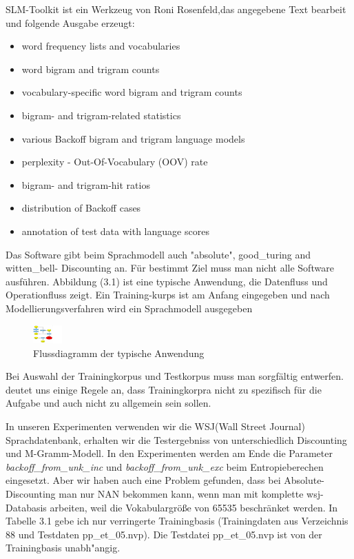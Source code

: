 SLM-Toolkit ist ein Werkzeug von Roni Rosenfeld,das angegebene Text bearbeit und folgende Ausgabe erzeugt:
\begin{itemize}
	\item word frequency lists and vocabularies
	\item word bigram and trigram counts
	\item vocabulary-specific word bigram and trigram counts
	\item bigram- and trigram-related statistics
	\item various Backoff bigram and trigram language models
	\item perplexity - Out-Of-Vocabulary (OOV) rate 
	\item bigram- and trigram-hit ratios
	\item distribution of Backoff cases 
	\item annotation of test data with language scores 
\end{itemize}

Das Software gibt beim Sprachmodell auch "absolute", good\_turing and witten\_bell- Discounting an.
F\"ur bestimmt Ziel muss man nicht alle Software ausf\"uhren. Abbildung (3.1) ist eine typische Anwendung, die Datenfluss und Operationfluss zeigt.
Ein Training-kurps ist am Anfang eingegeben und nach Modellierungsverfahren wird ein Sprachmodell ausgegeben


\begin{figure}[htbp]
	\includegraphics[width=0.1\textwidth]{bilder/toolkit.png}
	 \caption{Flussdiagramm der typische Anwendung}
  \label{fig:figure_2}
\end{figure}

Bei Auswahl der Trainingkorpus und Testkorpus muss man sorgf\"altig entwerfen. \cite{book_speech} deutet uns einige Regele an, dass Trainingkorpra nicht zu spezifisch f\"ur die Aufgabe und auch nicht zu allgemein sein sollen.  

In unseren Experimenten verwenden wir die WSJ(Wall Street Journal) Sprachdatenbank, erhalten wir die Testergebniss von unterschiedlich Discounting und M-Gramm-Modell. In den Experimenten werden am Ende die Parameter \emph{backoff\_from\_unk\_inc} und \emph{backoff\_from\_unk\_exc} beim Entropieberechen eingesetzt.  
 Aber wir haben auch eine Problem gefunden, dass bei Absolute-Discounting man nur NAN bekommen kann, wenn man mit komplette wsj-Databasis arbeiten, weil die Vokabulargr\"o\ss e von 65535 beschr\"anket werden. In Tabelle 3.1 gebe ich nur verringerte Trainingbasis (Trainingdaten aus Verzeichnis 88 und Testdaten pp\_et\_05.nvp). Die Testdatei pp\_et\_05.nvp ist von der Trainingbasis unabh"angig.
 
